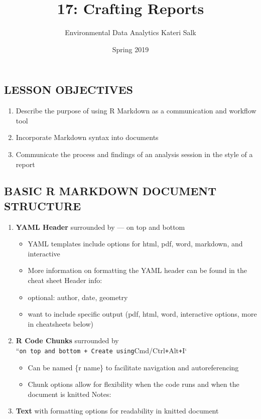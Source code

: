 \documentclass[]{article}
\title{17: Crafting Reports}
\author{Environmental Data Analytics \textbar{} Kateri Salk}
\date{Spring 2019}
\providecommand{\tightlist}{%
  \setlength{\itemsep}{0pt}\setlength{\parskip}{0pt}}
\begin{document}
\maketitle

\subsection{LESSON OBJECTIVES}\label{lesson-objectives}

\begin{enumerate}
\def\labelenumi{\arabic{enumi}.}
\tightlist
\item
  Describe the purpose of using R Markdown as a communication and
  workflow tool
\item
  Incorporate Markdown syntax into documents
\item
  Communicate the process and findings of an analysis session in the
  style of a report
\end{enumerate}

\subsection{BASIC R MARKDOWN DOCUMENT
STRUCTURE}\label{basic-r-markdown-document-structure}

\begin{enumerate}
\def\labelenumi{\arabic{enumi}.}
\tightlist
\item
  \textbf{YAML Header} surrounded by --- on top and bottom

  \begin{itemize}
  \tightlist
  \item
    YAML templates include options for html, pdf, word, markdown, and
    interactive
  \item
    More information on formatting the YAML header can be found in the
    cheat sheet Header info:
  \item
    optional: author, date, geometry
  \item
    want to include specific output (pdf, html, word, interactive
    options, more in cheatsheets below)
  \end{itemize}
\item
  \textbf{R Code Chunks} surrounded by
  ``\texttt{on\ top\ and\ bottom\ +\ Create\ using}Cmd/Ctrl\texttt{+}Alt\texttt{+}I`

  \begin{itemize}
  \tightlist
  \item
    Can be named \{r name\} to facilitate navigation and autoreferencing
  \item
    Chunk options allow for flexibility when the code runs and when the
    document is knitted Notes:
  \end{itemize}
\item
  \textbf{Text} with formatting options for readability in knitted
  document
\end{enumerate}
\end{document}
